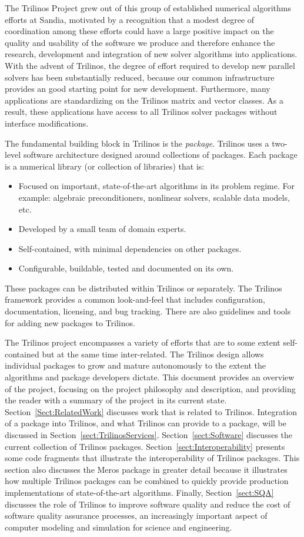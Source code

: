 \documentclass[acmtoms,acmnow]{acmtrans2m}
\begin{document}
The Trilinos Project grew out of this group of established numerical algorithms
efforts at Sandia, motivated by  a recognition that a modest degree of 
coordination among these efforts could have a large positive impact on 
the quality and usability of the software we produce and therefore enhance the
research, development and integration of new solver algorithms into
applications.  With the advent of Trilinos, the degree of effort required 
to develop new parallel solvers has been 
substantially reduced, because our common infrastructure provides an good 
starting point for new development.  Furthermore, many applications 
are standardizing on the 
Trilinos matrix and vector classes.  As a result, these applications
have access to all Trilinos solver packages without  
interface modifications. 

The fundamental building block in Trilinos is the {\it package}. Trilinos
uses a two-level software architecture designed around collections of
packages.  Each package is a numerical library (or collection of
libraries) that is:
\begin{itemize}
\item Focused on important, state-of-the-art algorithms in its problem
regime.  For example: algebraic preconditioners, nonlinear solvers, 
scalable data models, etc.
\item Developed by a small team of domain experts.
\item Self-contained, with minimal dependencies on other packages.
\item Configurable, buildable, tested and documented on its own.
\end{itemize}
These packages can be distributed within Trilinos or separately. 
The Trilinos framework provides a common look-and-feel that 
includes configuration, documentation, licensing, and bug 
tracking.  There are also guidelines and tools for adding new packages 
to Trilinos. 

The Trilinos project encompasses a variety of efforts that are to some
extent self-contained but at the same time inter-related.  The
Trilinos design allows individual packages to grow and mature
autonomously to the extent the algorithms and package developers
dictate.  This document provides an overview of the project,
focusing on the project philosophy and description, and
providing the reader with a summary of the project in its current
state. 
Section~\ref{Sect:RelatedWork} discusses work that is related to Trilinos. 
Integration of a package into Trilinos, and what Trilinos can provide
to a package, will be discussed in Section~\ref{sect:TrilinosServices}.
Section~\ref{sect:Software} discusses the current collection of Trilinos
packages.  Section~\ref{sect:Interoperability} presents some code
fragments that illustrate the interoperability of Trilinos packages.
This section also discusses the Meros package in greater detail
because it illustrates how multiple Trilinos packages can be combined 
to quickly provide production implementations of state-of-the-art 
algorithms.  Finally, Section~\ref{sect:SQA} discusses the role of 
Trilinos to improve software quality and reduce the cost of software 
quality assurance processes, an increasingly important aspect
of computer modeling and simulation for science and engineering.  
\end{document}
